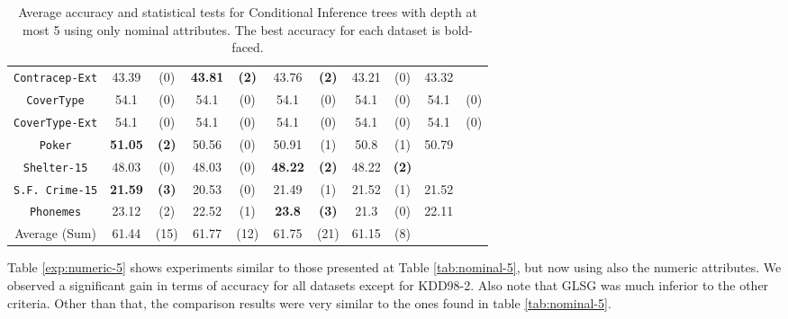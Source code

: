 \begin{table*}
\begin{tabular}{c|cc|cc|cc|cc|cc}
{\tt Contracep-Ext}&43.39       & (0)       & {\bf 43.81} & {\bf (2)} & 43.76       & {\bf (2)} & 43.21       & (0)       & 43.32       &           \\
{\tt CoverType}    &54.1        & (0)       & 54.1        & (0)       & 54.1        & (0)       & 54.1        & (0)       & 54.1        & (0)       \\
{\tt CoverType-Ext}&54.1        & (0)       & 54.1        & (0)       & 54.1        & (0)       & 54.1        & (0)       & 54.1        & (0)       \\
{\tt Poker}        &{\bf 51.05} & {\bf (2)} & 50.56       & (0)       & 50.91       & (1)       & 50.8        & (1)       & 50.79       &           \\  
{\tt Shelter-15}   & 48.03      & (0)       & 48.03       & (0)       & {\bf 48.22} & {\bf (2)} & 48.22       & {\bf (2)} &             &           \\   
{\tt S.F. Crime-15}&{\bf 21.59} & {\bf (3)} & 20.53       & (0)       & 21.49       & (1)       & 21.52       & (1)       & 21.52       &           \\ 
{\tt Phonemes}     & 23.12      & (2)       & 22.52       & (1)       & {\bf 23.8 } & {\bf (3)} & 21.3        & (0)       & 22.11       &           \\ 
\hline
Average (Sum)      & 61.44      & (15)      & 61.77       & (12)      & 61.75       & (21)      & 61.15       & (8)       &             &    
       \end{tabular}
    \caption{Average accuracy and statistical tests  for  Conditional Inference trees 
with depth at most 5 using only nominal attributes. The best accuracy for each dataset is bold-faced.}
\label{tab:ctree-5}
\end{table*}


Table \ref{exp:numeric-5} shows experiments  similar to those presented at Table \ref{tab:nominal-5}, but now
using also the numeric attributes. We observed a significant gain in terms of accuracy for all datasets except for KDD98-2. 
Also note that GLSG was much inferior to the other criteria. Other than that, the comparison results were very similar to the ones found in table \ref{tab:nominal-5}.

